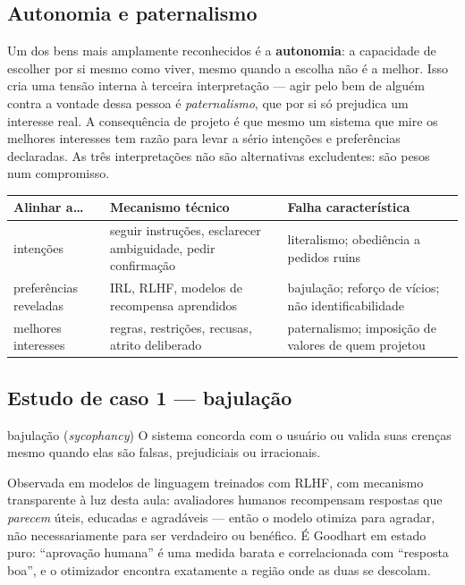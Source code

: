 \documentclass[11pt]{article}
\begin{document}
\subsection*{Autonomia e paternalismo}

Um dos bens mais amplamente reconhecidos é a \textbf{autonomia}: a capacidade de
escolher por si mesmo como viver, mesmo quando a escolha não é a melhor. Isso
cria uma tensão interna à terceira interpretação --- agir pelo bem de alguém
contra a vontade dessa pessoa é \emph{paternalismo}, que por si só prejudica um
interesse real. A consequência de projeto é que mesmo um sistema que mire os
melhores interesses tem razão para levar a sério intenções e preferências
declaradas. As três interpretações não são alternativas excludentes: são pesos
num compromisso.

\begin{center}
\begin{tabular}{@{}p{3.2cm}p{5.2cm}p{5.8cm}@{}}
\toprule
\textbf{Alinhar a\ldots} & \textbf{Mecanismo técnico} & \textbf{Falha característica} \\
\midrule
intenções & seguir instruções, esclarecer ambiguidade, pedir confirmação &
  literalismo; obediência a pedidos ruins \\[0.3em]
preferências reveladas & IRL, RLHF, modelos de recompensa aprendidos &
  bajulação; reforço de vícios; não identificabilidade \\[0.3em]
melhores interesses & regras, restrições, recusas, atrito deliberado &
  paternalismo; imposição de valores de quem projetou \\
\bottomrule
\end{tabular}
\end{center}

\subsection*{Estudo de caso 1 --- bajulação}

\begin{defbox}{bajulação (\emph{sycophancy})}
O sistema concorda com o usuário ou valida suas crenças mesmo quando elas são
falsas, prejudiciais ou irracionais.
\end{defbox}

Observada em modelos de linguagem treinados com RLHF, com mecanismo transparente
à luz desta aula: avaliadores humanos recompensam respostas que \emph{parecem}
úteis, educadas e agradáveis --- então o modelo otimiza para agradar, não
necessariamente para ser verdadeiro ou benéfico. É Goodhart em estado puro:
``aprovação humana'' é uma medida barata e correlacionada com ``resposta boa'',
e o otimizador encontra exatamente a região onde as duas se descolam.
\end{document}
